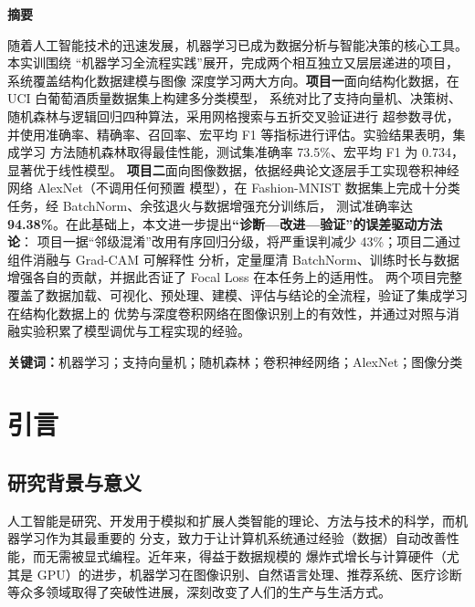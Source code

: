 \documentclass[12pt,a4paper,fontset=fandol]{ctexart}   %
\numberwithin{figure}{section}
\numberwithin{table}{section}
\numberwithin{equation}{section}
\begin{document}
\begin{center}{\Large\bfseries 摘\quad 要}\end{center}
\par 随着人工智能技术的迅速发展，机器学习已成为数据分析与智能决策的核心工具。本实训围绕
“机器学习全流程实践”展开，完成两个相互独立又层层递进的项目，系统覆盖结构化数据建模与图像
深度学习两大方向。\textbf{项目一}面向结构化数据，在 UCI 白葡萄酒质量数据集上构建多分类模型，
系统对比了支持向量机、决策树、随机森林与逻辑回归四种算法，采用网格搜索与五折交叉验证进行
超参数寻优，并使用准确率、精确率、召回率、宏平均 F1 等指标进行评估。实验结果表明，集成学习
方法随机森林取得最佳性能，测试集准确率 73.5\%、宏平均 F1 为 0.734，显著优于线性模型。
\textbf{项目二}面向图像数据，依据经典论文逐层手工实现卷积神经网络 AlexNet（不调用任何预置
模型），在 Fashion-MNIST 数据集上完成十分类任务，经 BatchNorm、余弦退火与数据增强充分训练后，
测试准确率达 \textbf{94.38\%}。在此基础上，本文进一步提出\textbf{“诊断—改进—验证”的误差驱动方法论}：
项目一据“邻级混淆”改用有序回归分级，将严重误判减少 43\%；项目二通过组件消融与 Grad-CAM 可解释性
分析，定量厘清 BatchNorm、训练时长与数据增强各自的贡献，并据此否证了 Focal Loss 在本任务上的适用性。
两个项目完整覆盖了数据加载、可视化、预处理、建模、评估与结论的全流程，验证了集成学习在结构化数据上的
优势与深度卷积网络在图像识别上的有效性，并通过对照与消融实验积累了模型调优与工程实现的经验。

\par\vspace{1ex}
\noindent\textbf{关键词：}机器学习；支持向量机；随机森林；卷积神经网络；AlexNet；图像分类

\newpage
\tableofcontents
\newpage

\section{引言}

\subsection{研究背景与意义}
人工智能是研究、开发用于模拟和扩展人类智能的理论、方法与技术的科学，而机器学习作为其最重要的
分支，致力于让计算机系统通过经验（数据）自动改善性能，而无需被显式编程。近年来，得益于数据规模的
爆炸式增长与计算硬件（尤其是 GPU）的进步，机器学习在图像识别、自然语言处理、推荐系统、医疗诊断
等众多领域取得了突破性进展，深刻改变了人们的生产与生活方式。
\end{document}
